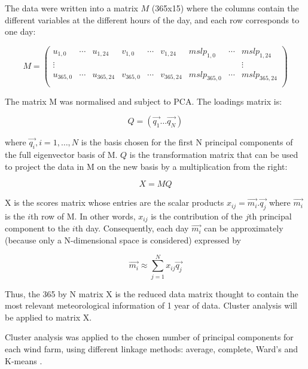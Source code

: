 The data were written into a matrix $M$ (365x15) where the columns contain the different variables at the different hours of the day, and each row corresponds to one day:

\begin{equation}
M = \begin{pmatrix} 
u_{1,0} & \cdots & u_{1,24} & v_{1,0} & \cdots & v_{1,24} & mslp_{1,0} & \cdots & mslp_{1,24} \\
\vdots  &        &          &         &        &          &            &        & \vdots \\
u_{365,0} & \cdots & u_{365,24} & v_{365,0} & \cdots & v_{365,24} & mslp_{365,0} & \cdots & mslp_{365,24} \\
\end{pmatrix}
\end{equation}

The matrix M was normalised and subject to PCA. The loadings matrix is: 

\begin{equation}
Q=(\overrightarrow{q_1} \ldots \overrightarrow{q_N} )
\end{equation}

where ${\overrightarrow{q_i}},i=1,\ldots,N$ is the basis chosen for the first N principal components of the full eigenvector basis of M. $Q$ is the transformation matrix that can be used to project the data in M on the new basis by a multiplication from the right:

\begin{equation}
X=MQ
\end{equation}

X is the scores matrix whose entries are the scalar products $x_{ij} = \overrightarrow{m_i}.\overrightarrow{q_j}$ where $\overrightarrow{m_i}$ is the $i$th row of M. In other words, $x_{ij}$ is the contribution of the $j$th principal component to the $i$th day. Consequently, each day $\overrightarrow{m_i}$ can be approximately (because only a N-dimensional space is considered) expressed by

\begin{equation}
\overrightarrow{m_i} \approx \sum_{j=1}^N x_{ij}\overrightarrow{q_j}
\end{equation}

Thus, the 365 by N matrix X is the reduced data matrix thought to contain the most relevant meteorological information of 1 year of data.  Cluster analysis will be applied to matrix X. 

Cluster analysis was applied to the chosen number of principal components for each wind farm, using different linkage methods: average, complete, Ward's and K-means \citep{Wilks2005,LangeFocken2005}.

